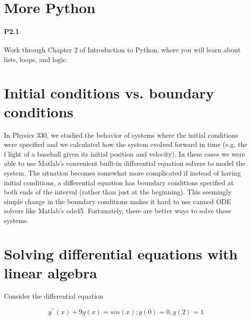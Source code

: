 \documentclass{book}
\theoremstyle{plain}
\theoremstyle{definition}
\numberwithin{exm}{chapter}
\theoremstyle{remark}
\theoremstyle{summary}
\theoremstyle{overview}
\begin{document}
\section*{More Python}
\paragraph*{P2.1}Work through Chapter 2 of Introduction to Python, where you will learn about lists, loops, and logic.

\section*{Initial conditions vs. boundary conditions}
In Physics 330, we studied the behavior of systems where the initial conditions were specified and we calculated how the system evolved forward in time (e.g. the f light of a baseball given its initial position and velocity). In these cases we were able to use Matlab\rq s convenient built-in differential equation solvers to model the system. The situation becomes somewhat more complicated if instead of having initial conditions, a differential equation has boundary conditions specified at both ends of the interval (rather than just at the beginning). This seemingly simple change in the boundary conditions makes it hard to use canned ODE solvers like Matlab\rq s ode45. Fortunately, there are better ways to solve these systems.

\section*{Solving differential equations with linear algebra}

Consider the differential equation

\begin{equation} \label{eq:21}
	y^{\prime\prime}(x) + 9y(x) = sin(x) ; y(0) = 0, y(2) = 1
\end{equation}

\end{document}
